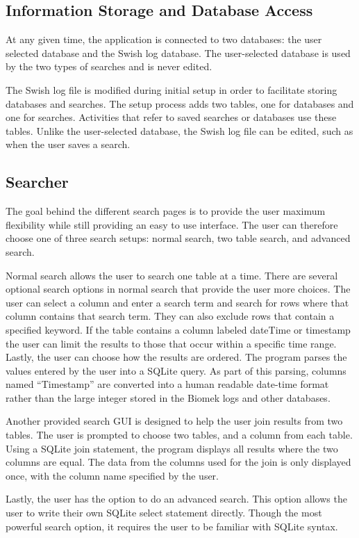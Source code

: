 \documentclass[letterpaper,11pt,twoside,final]{article}
\begin{document}
\subsection*{Information Storage and Database Access}
At any given time, the application is connected to two databases: the
user selected database and the Swish log database. The user-selected
database is used by the two types of searches and is never edited.

The Swish log file is modified during initial setup in order to facilitate storing
databases and searches. The setup process adds two tables,
one for databases and one for searches. Activities that refer to saved
  searches or databases use these tables. Unlike the user-selected database,
the Swish log file can be edited, such as when the user saves a
search.

\subsection*{Searcher}
The goal behind the different search pages is to provide the user maximum
flexibility while still providing an easy to use interface. The user
can therefore choose one of three search setups: normal search, two
table search, and advanced search.

Normal search allows the user to
search one table at a time. There are several optional search options
in normal search that provide the user more choices. The user can
select a column and enter a search term and search for rows where that
column contains that search term. They can also exclude rows that
contain a specified keyword. If the table contains a column labeled
dateTime or timestamp the user can limit the results to those that
occur within a specific time range. Lastly, the user can choose how
the results are ordered. 
The program parses the values entered by the user into a SQLite
query. As part of this parsing, columns named ``Timestamp'' are
converted into a human readable date-time format rather than the large
integer stored in the Biomek logs and other databases.

Another provided search GUI is designed to help the user join results
from two tables. The user is prompted to choose two tables, and a
column from each table. Using a SQLite join statement, the program
displays all results where the two columns are equal. The data from
the columns used for the join is only displayed once, with the column
name specified by the user.

Lastly, the user has the option to do an advanced search. This option
allows the user to write their own SQLite select statement
directly. Though the most powerful search option, it requires the
user to be familiar with SQLite syntax.
\end{document}
